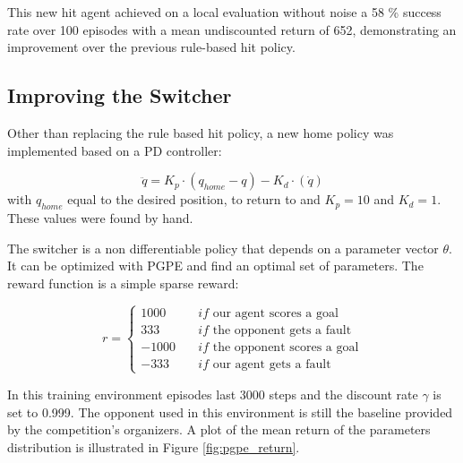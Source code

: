 This new hit agent achieved on a local evaluation without noise a 58 \% success rate over 100 episodes with a mean undiscounted return of 652, 
demonstrating an improvement over the previous rule-based hit policy.

\subsection{Improving the Switcher}
Other than replacing the rule based hit policy, a new home policy was implemented based on a PD controller:

\begin{equation*}
    \ddot{q} = K_p \cdot \left(q_{home} - q\right) - K_d \cdot \left(\dot{q}\right)
\end{equation*}
with $q_{home}$ equal to the desired position,  to return to and $K_p = 10$ and $K_d = 1$. These values were found by hand.

The switcher is a non differentiable policy that depends on a parameter vector $\theta$. It can be optimized with PGPE \cite{PGPE} and find an optimal set of parameters.
The reward function is a simple sparse reward:

\begin{equation*}
    r = \left\{
        \begin{aligned}
            1000 \quad &if \text{ our agent scores a goal} \\
            333 \quad &if \text{ the opponent gets a fault} \\
            -1000 \quad &if \text{ the opponent scores a goal} \\
            -333 \quad &if \text{ our agent gets a fault}
        \end{aligned}
    \right.
\end{equation*}

In this training environment episodes last 3000 steps and the discount rate $\gamma$ is set to 0.999.
The opponent used in this environment is still the baseline provided by the competition's organizers.
A plot of the mean return of the parameters distribution is illustrated in Figure \ref{fig:pgpe_return}.

